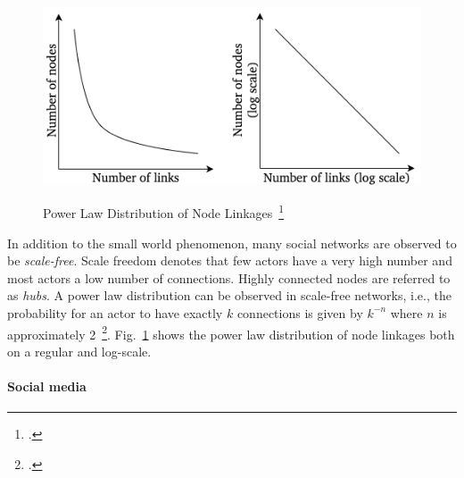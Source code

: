 \begin{figure}[h]
  \centering
  \includegraphics[height=6cm]{img/power_law_linkages}
  \caption[Power Law Distribution of Node Linkages]{Power Law Distribution of Node Linkages~\footcite{Barabasi2003}}
\label{fig:power_law}
\end{figure}

In addition to the small world phenomenon, many social networks are observed to
be \textit{scale-free}.
Scale freedom denotes that few actors have a very high number and most actors 
a low number of connections.
Highly connected nodes are referred to as \textit{hubs}.
A power law distribution can be observed in scale-free networks, i.e., the
probability for an actor to have exactly $k$ connections is given by $k^{-n}$
where $n$ is approximately 2~\footcite{Barabasi2003}.
Fig.~\ref{fig:power_law} shows the power law distribution of node linkages both
on a regular and log-scale.

\paragraph{Social media}
\label{sub:sn_social_media}

